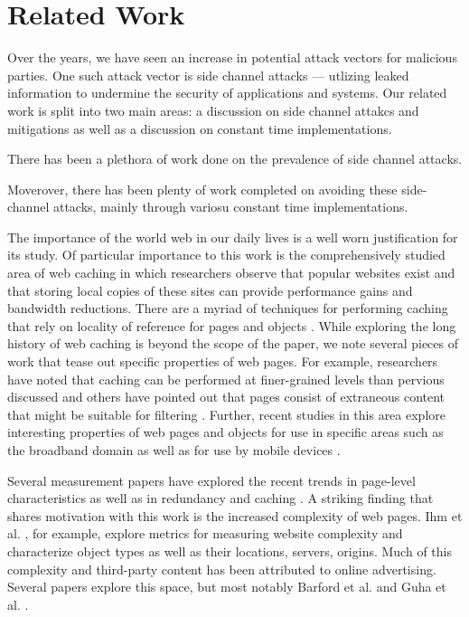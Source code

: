 \section{Related Work}
\label{sec:related}


Over the years, we have seen an increase in potential attack vectors for
malicious parties. One such attack vector is side channel attacks --- utlizing
leaked information to undermine the security of applications and systems.
Our related work is split into two main areas: a discussion on side channel
attakcs and mitigations as well as a discussion on constant time
implementations.

There has been a plethora of work done on the prevalence of side channel
attacks. 

Moverover, there has been plenty of work completed on avoiding these
side-channel attacks, mainly through variosu constant time implementations.


The importance of the world web in our daily lives is a well worn
justification for its study. Of particular importance to this work is
the comprehensively studied area of web caching in which researchers
observe that popular websites exist and that storing local copies of
these sites can provide performance gains and bandwidth
reductions\cite{breslau1999web}. There are a myriad of techniques for
performing caching that rely on locality of reference for pages and
objects \cite{rabinovich2002web}. While exploring the long history of
web caching is beyond the scope of the paper, we note several pieces
of work that tease out specific properties of web pages. For example,
researchers have noted that caching can be performed at finer-grained
levels than pervious discussed \cite{Wang:2014:MWM:2663716.2663739}
and others have pointed out that pages consist of extraneous content
that might be suitable for filtering
\cite{Krishnamurthy:2006:CMC:1135777.1135829}. Further, recent studies
in this area explore interesting properties of web pages and objects
for use in specific areas such as the broadband domain
\cite{sundaresan2013measuring} as well as for use by mobile devices
\cite{Qian:2012:WCS:2307636.2307649}.

Several measurement papers have explored the recent trends in
page-level characteristics as well as in redundancy and caching
\cite{ihm2011towards}. A striking finding that shares motivation with
this work is the increased complexity of web pages. Ihm et
al. \cite{butkiewicz2011understanding,ihm2011towards}, for example,
explore metrics for measuring website complexity and characterize
object types as well as their locations, servers, origins. Much of
this complexity and third-party content has been attributed to online
advertising. Several papers explore this space, but most notably
Barford et al.  \cite{Barford:2014:AHA:2566486.2567992} and Guha et
al. \cite{Guha:2010:CMO:1879141.1879152}.

